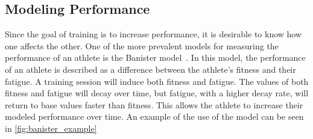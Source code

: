 \subsection{Modeling Performance}
\label{sec:modeling_performance}
Since the goal of training is to increase performance, it is desirable to know how one affects the other.
One of the more prevalent models for measuring the performance of an athlete is the Banister model~\cite{calvert1976systems}. 
In this model, the performance of an athlete is described as a difference between the athlete's fitness and their fatigue. 
A training session will induce both fitness and fatigue.
The values of both fitness and fatigue will decay over time, but fatigue, with a higher decay rate, will return to base values faster than fitness.
This allows the athlete to increase their modeled performance over time.
An example of the use of the model can be seen in \cref{fig:banister_example}


